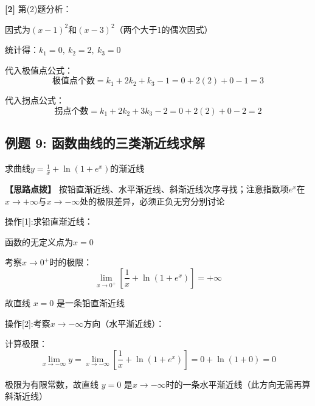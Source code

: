\documentclass[11pt,a4paper,UTF8]{ctexart}
\begin{document}
\textbf{[2]} 第(2)题分析：

\begin{solbox}[分步推导与答题规范]
因式为$(x-1)^2$和$(x-3)^2$（两个大于1的偶次因式）

统计得：$k_1 = 0,\ k_2 = 2,\ k_3 = 0$

代入极值点公式：
\begin{equation*}
\text{极值点个数} = k_1 + 2k_2 + k_3 - 1 = 0 + 2(2) + 0 - 1 = 3
\end{equation*}


代入拐点公式：
\begin{equation*}
\text{拐点个数} = k_1 + 2k_2 + 3k_3 - 2 = 0 + 2(2) + 0 - 2 = 2
\end{equation*}


\end{solbox}


\subsection{例题 9: 函数曲线的三类渐近线求解}

求曲线$y = \frac{1}{x} + \ln(1 + e^x)$的渐近线

\textbf{\color{DeepPurple}【思路点拨】} 按铅直渐近线、水平渐近线、斜渐近线次序寻找；注意指数项$e^x$在$x \to +\infty$与$x \to -\infty$处的极限差异，必须正负无穷分别讨论


操作[1]:求铅直渐近线：

\begin{solbox}[分步推导与答题规范]
函数的无定义点为$x = 0$

考察$x \to 0^+$时的极限：
\begin{equation*}
\lim_{x \to 0^+} \left[\frac{1}{x} + \ln(1 + e^x)\right] = +\infty
\end{equation*}


故直线 \textit{}$x = 0$\textit{} 是一条铅直渐近线
\end{solbox}

操作[2]:考察$x \to -\infty$方向（水平渐近线）：

\begin{solbox}[分步推导与答题规范]
计算极限：
\begin{equation*}
\lim_{x \to -\infty} y = \lim_{x \to -\infty} \left[\frac{1}{x} + \ln(1 + e^x)\right] = 0 + \ln(1 + 0) = 0
\end{equation*}


极限为有限常数，故直线 \textit{}$y = 0$\textit{} 是$x \to -\infty$时的一条水平渐近线（此方向无需再算斜渐近线）
\end{solbox}
\end{document}
